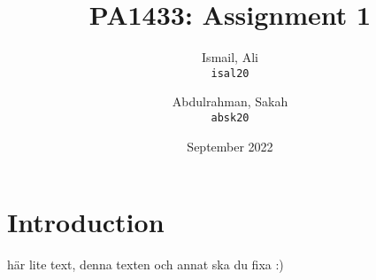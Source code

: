 \documentclass{article}
\title{PA1433: Assignment 1}
\author{
  Ismail, Ali\\
  \texttt{isal20}
  \and
  Abdulrahman, Sakah\\
  \texttt{absk20}
}
\date{September 2022}
\begin{document}
    \maketitle
    \section{Introduction}

    här lite text, denna texten och annat ska du fixa :)
\end{document}
